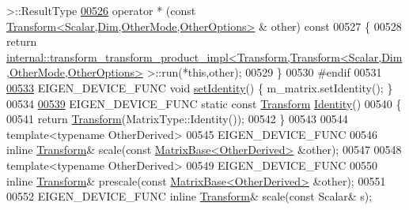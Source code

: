 \begin{DoxyCode}
       >::ResultType
\hyperlink{group___geometry___module_a20df28b0b153575133a8543fd215ff9d}{00526}     operator * (\textcolor{keyword}{const} \hyperlink{group___geometry___module_class_eigen_1_1_transform}{Transform<Scalar,Dim,OtherMode,OtherOptions>}
      & other)\textcolor{keyword}{ const}
00527 \textcolor{keyword}{  }\{
00528     \textcolor{keywordflow}{return} 
      \hyperlink{struct_eigen_1_1internal_1_1transform__transform__product__impl}{internal::transform\_transform\_product\_impl<Transform,Transform<Scalar,Dim,OtherMode,OtherOptions>}
       >::run(*\textcolor{keyword}{this},other);
00529   \}
00530 \textcolor{preprocessor}{  #endif}
00531 
\hyperlink{group___geometry___module_a4f0c6b74994904b56b621cf3d9ac4a0f}{00533}   EIGEN\_DEVICE\_FUNC \textcolor{keywordtype}{void} \hyperlink{group___geometry___module_a4f0c6b74994904b56b621cf3d9ac4a0f}{setIdentity}() \{ m\_matrix.setIdentity(); \}
00534 
\hyperlink{group___geometry___module_a41e2e58b09790eb8e3e220acceb7de1f}{00539}   EIGEN\_DEVICE\_FUNC \textcolor{keyword}{static} \textcolor{keyword}{const} \hyperlink{group___geometry___module_class_eigen_1_1_transform}{Transform} \hyperlink{group___geometry___module_a41e2e58b09790eb8e3e220acceb7de1f}{Identity}()
00540   \{
00541     \textcolor{keywordflow}{return} \hyperlink{group___geometry___module_class_eigen_1_1_transform}{Transform}(MatrixType::Identity());
00542   \}
00543 
00544   \textcolor{keyword}{template}<\textcolor{keyword}{typename} OtherDerived>
00545   EIGEN\_DEVICE\_FUNC 
00546   \textcolor{keyword}{inline} \hyperlink{group___geometry___module_class_eigen_1_1_transform}{Transform}& scale(\textcolor{keyword}{const} \hyperlink{group___core___module_class_eigen_1_1_matrix_base}{MatrixBase<OtherDerived>} &other);
00547 
00548   \textcolor{keyword}{template}<\textcolor{keyword}{typename} OtherDerived>
00549   EIGEN\_DEVICE\_FUNC
00550   \textcolor{keyword}{inline} \hyperlink{group___geometry___module_class_eigen_1_1_transform}{Transform}& prescale(\textcolor{keyword}{const} \hyperlink{group___core___module_class_eigen_1_1_matrix_base}{MatrixBase<OtherDerived>} &other);
00551 
00552   EIGEN\_DEVICE\_FUNC \textcolor{keyword}{inline} \hyperlink{group___geometry___module_class_eigen_1_1_transform}{Transform}& scale(\textcolor{keyword}{const} Scalar& s);

\end{DoxyCode}
